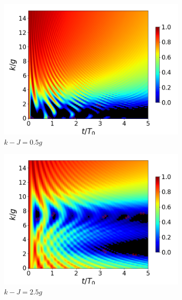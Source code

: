 \begin{figure}[h]
    \begin{subfigure}{0.49\textwidth}
        \includegraphics[width=\textwidth]{figuras/ch4/concu/k/eg1+ge1 d=0.0g x=0.5g J=0.0g gamma=0.25g concu k dis.png}
        \caption{$k-J=0.5g$}
        \label{fig4:concu k 1 d1}
    \end{subfigure}
    \hfill
    \begin{subfigure}{0.49\textwidth}
        \includegraphics[width=\textwidth]{figuras/ch4/concu/k/eg1+ge1 d=0.0g x=5.0g J=0.0g gamma=0.25g concu k dis.png}
        \caption{$k-J=2.5g$}
        \label{fig4:concu k 1 d2}
    \end{subfigure}
    \caption{}
    \label{fig4:concu k 1}
\end{figure}
